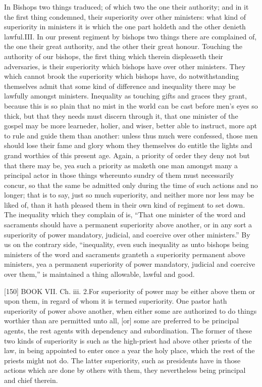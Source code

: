 In Bishops two things traduced; of which two the one their authority; and in it the first thing condemned, their superiority over other ministers: what kind of superiority in ministers it is which the one part holdeth and the other denieth lawful.III. In our present regiment by bishops two things there are complained of, the one their great authority, and the other their great honour. Touching the authority of our bishops, the first thing which therein displeaseth their adversaries, is their superiority which bishops have over other ministers. They which cannot brook the superiority which bishops have, do notwithstanding themselves admit that some kind of difference and inequality there may be lawfully amongst ministers. Inequality as touching gifts and graces they grant, because this is so plain that no mist in the world can be cast before men’s eyes so thick, but that they needs must discern through it, that one minister of the gospel may be more learneder, holier, and wiser, better able to instruct, more apt to rule and guide them than another: unless thus much were confessed, those men should lose their fame and glory whom they themselves do entitle the lights and grand worthies of this present age. Again, a priority of order they deny not but that there may be, yea such a priority as maketh one man amongst many a principal actor in those things whereunto sundry of them must necessarily concur, so that the same be admitted only during the time of such actions and no longer; that is to say, just so much superiority, and neither more nor less may be liked of, than it hath pleased them in their own kind of regiment to set down. The inequality which they complain of is, “That one minister of the word and sacraments should have a permanent superiority above another, or in any sort a superiority of power mandatory, judicial, and coercive over other ministers.” By us on the contrary side, “inequality, even such inequality as unto bishops being ministers of the word and sacraments granteth a superiority permanent above ministers, yea a permanent superiority of power mandatory, judicial and coercive over them,” is maintained a thing allowable, lawful and good.

[150]
BOOK VII. Ch. iii. 2.For superiority of power may be either above them or upon them, in regard of whom it is termed superiority. One pastor hath superiority of power above another, when either some are authorized to do things worthier than are permitted unto all, [or] some are preferred to be principal agents, the rest agents with dependency and subordination. The former of these two kinds of superiority is such as the high-priest had above other priests of the law, in being appointed to enter once a year the holy place, which the rest of the priests might not do. The latter superiority, such as presidents have in those actions which are done by others with them, they nevertheless being principal and chief therein.

